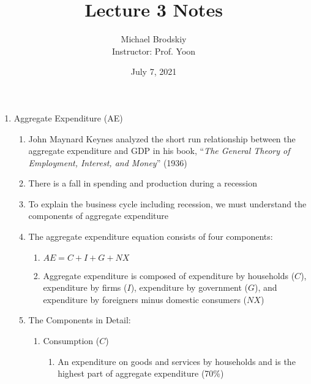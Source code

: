 \documentclass[12pt]{article}
\title{Lecture 3 Notes}
\date{July 7, 2021}
\author{Michael Brodskiy\\ \small Instructor: Prof. Yoon}
\begin{document}
    \maketitle

    \begin{enumerate}

      \item Aggregate Expenditure (AE)

        \begin{enumerate}

          \item John Maynard Keynes analyzed the short run relationship between the aggregate expenditure and GDP in his book, “\textit{The General Theory of Employment, Interest, and Money}” (1936)

          \item There is a fall in spending and production during a recession
            
          \item To explain the business cycle including recession, we must understand the components of aggregate expenditure

          \item The aggregate expenditure equation consists of four components:

            \begin{enumerate}

              \item $AE = C + I + G + NX$

              \item Aggregate expenditure is composed of expenditure by households ($C$), expenditure by firms ($I$), expenditure by government ($G$), and expenditure by foreigners minus domestic consumers ($NX$)

            \end{enumerate}

          \item The Components in Detail:

            \begin{enumerate}

              \item Consumption ($C$)

                \begin{enumerate}

                  \item An expenditure on goods and services by households and is the highest part of aggregate expenditure (70\%)


\end{enumerate}
\end{enumerate}
\end{enumerate}
\end{enumerate}
\end{document}
